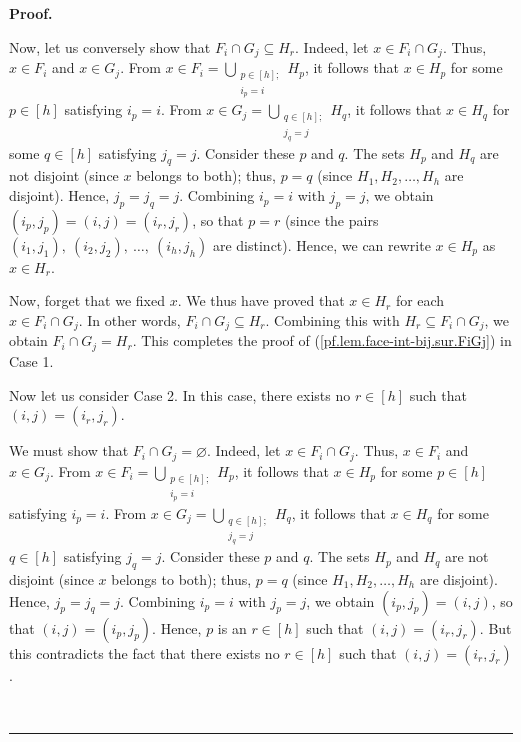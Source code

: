 \documentclass[12pt]{article}
\theoremstyle{definition}%
\theoremstyle{definition}%
\theoremstyle{remark}%
\newcommand{\interval}[1]{\left[ #1 \right]} %
\newenvironment{proof}[1][Proof]{\noindent\textbf{#1.} }{\ \rule{0.5em}{0.5em}}
\begin{document}
\begin{proof}
\begin{enumerate}
Now, let us conversely show that $F_{i}\cap G_{j}\subseteq H_{r}$. Indeed, let
$x\in F_{i}\cap G_{j}$. Thus, $x\in F_{i}$ and $x\in G_{j}$. From $x\in
F_{i}=\bigcup\limits_{\substack{p\in\interval{h} ;\\i_{p}=i}}H_{p}$, it
follows that $x\in H_{p}$ for some $p\in\interval{h} $ satisfying
$i_{p}=i$. From $x\in G_{j}=\bigcup\limits_{\substack{q\in\interval{h}
;\\j_{q}=j}}H_{q}$, it follows that $x\in H_{q}$ for some $q\in\interval{h}$
satisfying $j_{q}=j$. Consider these $p$ and $q$. The sets $H_{p}$
and $H_{q}$ are not disjoint (since $x$ belongs to both); thus, $p=q$ (since
$H_{1},H_{2},\ldots,H_{h}$ are disjoint). Hence, $j_{p}=j_{q}=j$. Combining
$i_{p}=i$ with $j_{p}=j$, we obtain $\left(  i_{p},j_{p}\right)  =\left(
i,j\right)  =\left(  i_{r},j_{r}\right)  $, so that $p=r$ (since the pairs
$\left(  i_{1},j_{1}\right)  ,\ \left(  i_{2},j_{2}\right)  ,\ \ldots
,\ \left(  i_{h},j_{h}\right)  $ are distinct). Hence, we can rewrite $x\in
H_{p}$ as $x\in H_{r}$.

Now, forget that we fixed $x$. We thus have proved that $x\in H_{r}$ for each
$x\in F_{i}\cap G_{j}$. In other words, $F_{i}\cap G_{j}\subseteq H_{r}$.
Combining this with $H_{r}\subseteq F_{i}\cap G_{j}$, we obtain $F_{i}\cap
G_{j}=H_{r}$. This completes the proof of (\ref{pf.lem.face-int-bij.sur.FiGj})
in Case 1.

Now let us consider Case 2. In this case, there exists no $r\in
\interval{h}$ such that $\left(  i,j\right)  =\left(  i_{r},j_{r}\right)  $.

We must show that $F_{i}\cap G_{j}=\varnothing$. Indeed, let $x\in F_{i}\cap
G_{j}$. Thus, $x\in F_{i}$ and $x\in G_{j}$. From $x\in F_{i}=\bigcup
\limits_{\substack{p\in\interval{h} ;\\i_{p}=i}}H_{p}$, it follows that
$x\in H_{p}$ for some $p\in\interval{h} $ satisfying $i_{p}=i$. From
$x\in G_{j}=\bigcup\limits_{\substack{q\in\interval{h} ;\\j_{q}=j}}H_{q}
$, it follows that $x\in H_{q}$ for some $q\in\interval{h} $ satisfying
$j_{q}=j$. Consider these $p$ and $q$. The sets $H_{p}$ and $H_{q}$ are not
disjoint (since $x$ belongs to both); thus, $p=q$ (since $H_{1},H_{2}
,\ldots,H_{h}$ are disjoint). Hence, $j_{p}=j_{q}=j$. Combining $i_{p}=i$ with
$j_{p}=j$, we obtain $\left(  i_{p},j_{p}\right)  =\left(  i,j\right)  $, so
that $\left(  i,j\right)  =\left(  i_{p},j_{p}\right)  $. Hence, $p$ is an
$r\in\interval{h} $ such that $\left(  i,j\right)  =\left(  i_{r}
,j_{r}\right)  $. But this contradicts the fact that there exists no
$r\in\interval{h} $ such that $\left(  i,j\right)  =\left(  i_{r}
,j_{r}\right)  $.


\end{enumerate}
\end{proof}
\end{document}
